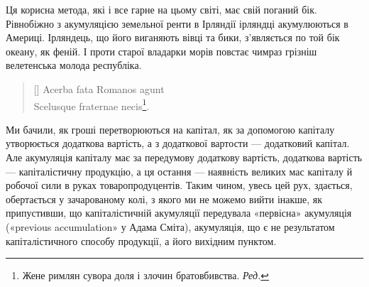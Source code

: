 Ця корисна метода, які і все гарне на цьому світі, має свій
поганий бік. Рівнобіжно з акумуляцією земельної ренти в Ірляндії
ірляндці акумулюються в Америці. Ірляндець, що його виганяють
вівці та бики, з’являється по той бік океану, як феній.
І проти старої владарки морів повстає чимраз грізніш велетенська
молода республіка.

\settowidth{\versewidth}{Scelusque fraternae necis.}
\begin{verse}[\versewidth]
Acerba fata Romanos agunt \\
Scelusque fraternae necis\footnote*{
Жене римлян сувора доля і злочин братовбивства. \emph{Ред.}
}.
\end{verse}



Ми бачили, як гроші перетворюються на капітал, як за допомогою
капіталу утворюється додаткова вартість, а з додаткової
вартости — додатковий капітал. Але акумуляція капіталу має за
передумову додаткову вартість, додаткова вартість — капіталістичну
продукцію, а ця остання — наявність великих мас капіталу
й робочої сили в руках товаропродуцентів. Таким чином,
увесь цей рух, здається, обертається у зачарованому колі, з
якого ми не можемо вийти інакше, як припустивши, що капіталістичній
акумуляції передувала «первісна» акумуляція («previous
accumulation» у Адама Сміта), акумуляція, що є не результатом
капіталістичного способу продукції, а його вихідним пунктом.

